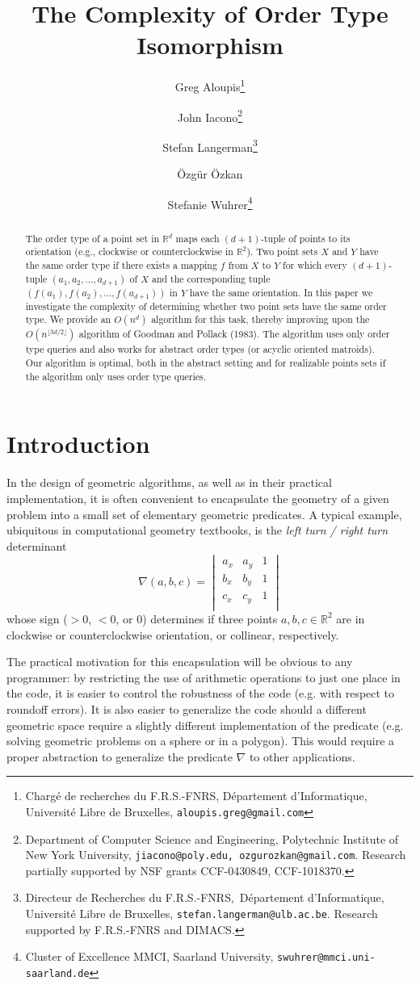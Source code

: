 \documentclass[leqno,12pt]{article}
\title{The Complexity of Order Type Isomorphism}
\date{}
\author{Greg Aloupis\thanks{Charg\'e de recherches du F.R.S.-FNRS,
    D\'{e}partement d'Informatique, Universit\'{e} Libre de Bruxelles, 
{\tt aloupis.greg@gmail.com}}
 \and 
 John Iacono\thanks{Department of Computer Science and Engineering, Polytechnic Institute of New York University, {\tt jiacono@poly.edu, ozgurozkan@gmail.com}. Research partially supported by NSF grants CCF-0430849,  CCF-1018370.}
  \and 
 Stefan Langerman\thanks{Directeur de Recherches du
   F.R.S.-FNRS,~D\'{e}partement d'Informatique, Universit\'{e} Libre de Bruxelles,
   {\tt stefan.langerman@ulb.ac.be}. Research supported by F.R.S.-FNRS
 and DIMACS.}
  \and
   \"{O}zg\"{u}r \"{O}zkan\footnotemark[2]
 \and 
    Stefanie Wuhrer\thanks{Cluster of Excellence MMCI, Saarland University,
   {\tt swuhrer@mmci.uni-saarland.de} }}
\def\R{\mathbb{R}}
\begin{document}
\maketitle


\begin{abstract}\small\baselineskip=9pt 
The order type of a point set in $\R^d$ maps each $(d{+}1)$-tuple of points
to its orientation (e.g., clockwise or counterclockwise in $\R^2$). 
Two point sets $X$ and $Y$ have the same order type if there
exists a mapping $f$ from $X$ to $Y$ for which every $(d{+}1)$-tuple 
$(a_1,a_2,\ldots,a_{d+1})$ of $X$ and the corresponding
tuple $(f(a_1),f(a_2),\ldots,f(a_{d+1}))$ in $Y$ have the same orientation.
In this paper we investigate the complexity of determining whether two
point sets have the same order type.
We provide an $O(n^d)$ algorithm for this task, thereby improving upon
the $O(n^{\lfloor{3d/2}\rfloor})$ algorithm of Goodman and Pollack (1983). The
algorithm uses only order type queries and also works for abstract
order types (or acyclic oriented matroids).
Our algorithm is optimal, both in the abstract setting and for
realizable points sets if the algorithm only uses order type queries.
\end{abstract}






\section{Introduction}
In the design of geometric algorithms, as well as in their practical
implementation, it is often convenient to encapsulate the geometry of
a given
problem into a small set of elementary geometric predicates. A typical
example, ubiquitous in computational geometry textbooks, is the \emph{left
turn / right turn} determinant
$$\nabla(a,b,c) =
\begin{vmatrix}
a_x & a_y & 1 \\
b_x & b_y & 1 \\
c_x & c_y & 1 \\
\end{vmatrix}
$$
whose sign ($>0$, $<0$, or $0$) determines if three points $a, b, c\in\R^2$
are in clockwise or counterclockwise orientation, or collinear, respectively.

The practical motivation for this encapsulation will be obvious to any
programmer: by restricting the use of arithmetic operations to just
one place in the code, it is easier to control the robustness of the
code (e.g. with respect to roundoff errors). It is also easier to
generalize the code should a different geometric space require a
slightly different implementation of the predicate (e.g. solving 
geometric problems on a sphere or in a polygon). This
would require a proper abstraction to generalize the predicate
$\nabla$ to other applications.
\end{document}
